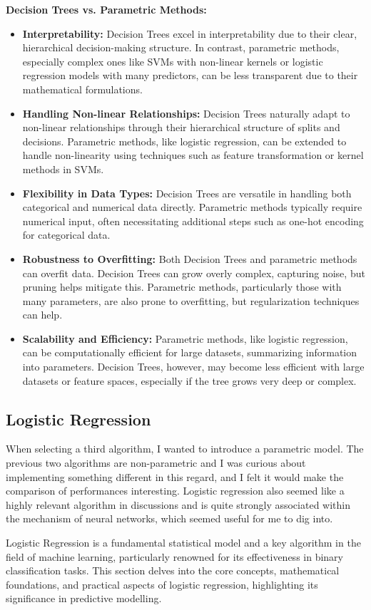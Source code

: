 \documentclass[letterpaper,10pt]{article}
\begin{document}
\textbf{Decision Trees vs. Parametric Methods:}
\begin{itemize}
\item \textbf{Interpretability:} Decision Trees excel in interpretability due to their clear, hierarchical decision-making structure. In contrast, parametric methods, especially complex ones like SVMs with non-linear kernels or logistic regression models with many predictors, can be less transparent due to their mathematical formulations.
\item \textbf{Handling Non-linear Relationships:} Decision Trees naturally adapt to non-linear relationships through their hierarchical structure of splits and decisions. Parametric methods, like logistic regression, can be extended to handle non-linearity using techniques such as feature transformation or kernel methods in SVMs.

\item \textbf{Flexibility in Data Types:} Decision Trees are versatile in handling both categorical and numerical data directly. Parametric methods typically require numerical input, often necessitating additional steps such as one-hot encoding for categorical data.

\item \textbf{Robustness to Overfitting:} Both Decision Trees and parametric methods can overfit data. Decision Trees can grow overly complex, capturing noise, but pruning helps mitigate this. Parametric methods, particularly those with many parameters, are also prone to overfitting, but regularization techniques can help.

\item \textbf{Scalability and Efficiency:} Parametric methods, like logistic regression, can be computationally efficient for large datasets, summarizing information into parameters. Decision Trees, however, may become less efficient with large datasets or feature spaces, especially if the tree grows very deep or complex.
\end{itemize}




\newpage

\subsection{Logistic Regression}
When selecting a third algorithm, I wanted to introduce a parametric model. The previous two algorithms are non-parametric and I was curious about implementing something different in this regard, and I felt it would make the comparison of performances interesting. Logistic regression also seemed like a highly relevant algorithm in discussions and is quite strongly associated within the mechanism of neural networks, which seemed useful for me to dig into. \par
Logistic Regression is a fundamental statistical model and a key algorithm in the field of machine learning, particularly renowned for its effectiveness in binary classification tasks. This section delves into the core concepts, mathematical foundations, and practical aspects of logistic regression, highlighting its significance in predictive modelling.\par
\end{document}
